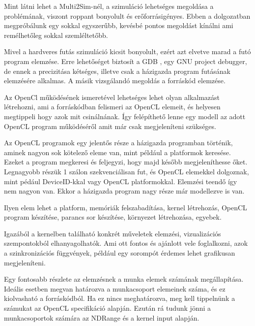 
Mint látni lehet a Multi2Sim-nél, a szimuláció lehetséges megoldása a problémának, viszont roppant bonyolult és erőforrásigényes. Ebben a dolgozatban megpróbálunk egy sokkal egyszerűbb, kevésbé pontos megoldást kínálni ami remélhetőleg sokkal szemléltetőbb. 

Mivel a hardveres futás szimuláció kicsit bonyolult, ezért azt elvetve marad a futó program elemzése. Erre lehetőséget biztosít a GDB \cite{gdb}, egy GNU project debugger, de ennek a precizitása kétséges, illetve csak a házigazda program futásának elemzésére alkalmas. A másik vizsgálandó megoldás a forráskód elemzése.

Az OpenCl működésének ismeretével lehetséges lehet olyan alkalmazást létrehozni, ami a forráskódban felismeri az OpenCL elemeit, és helyesen megtippeli hogy azok mit csinálnának. Így felépíthető lenne egy modell az adott OpenCL program működéséről amit már csak megjeleníteni szükséges.
 
Az OpenCL programok egy jelentős része a házigazda programban történik, aminek nagyon sok kötelező eleme van, mint például a platformok keresése. Ezeket a program megkeresi és feljegyzi, hogy majd később megjeleníthesse őket. Legnagyobb részük 1 szálon szekvenciálisan fut, és OpenCL elemekkel dolgoznak, mint pédául DeviceID-kkal vagy OpenCL platformokkal. Elemzési teendő így nem nagyon van. Ekkor a házigazda program nagy része már modellezve is van.

Ilyen elem lehet a platform, memóriák felszabadítása, kernel létrehozás, OpenCL program készítése, parancs sor készítése, környezet létrehozása, egyebek.



Igazából a kernelben található konkrét műveletek elemzési, vizualizációs szempontokból elhanyagolhatók. Ami ott fontos és ajánlott vele foglalkozni, azok a szinkronizációs függvények, például egy sorompót érdemes lehet grafikusan megjeleníteni.

Egy fontosabb részlete az elemzésnek a munka elemek számának megállapítása. Ideális esetben megvan határozva a munkacsoport elemeinek száma, és ez kiolvasható a forráskódból. Ha ez nincs meghatározva, meg kell tippelnünk a számukat az OpenCL specifikáció alapján. Ezután rá tudunk jönni a munkacsoportok számára az NDRange és a kernel input alapján.


